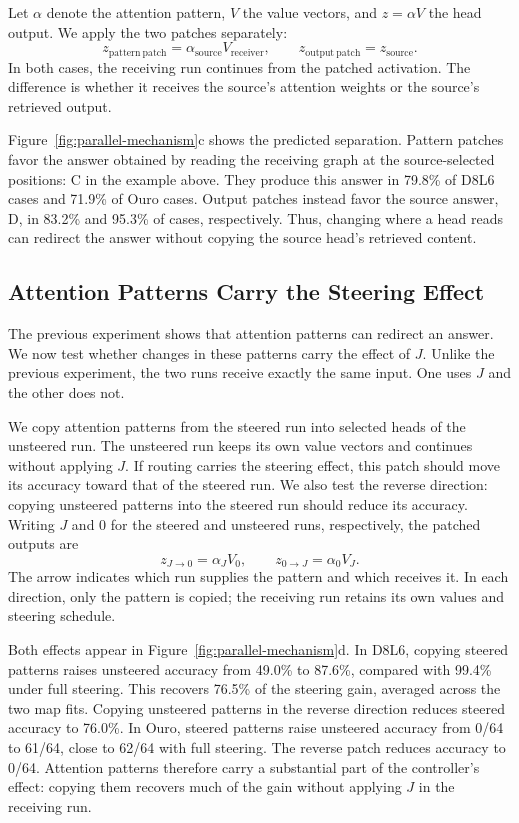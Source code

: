 \documentclass{article}
\begin{document}
Let $\alpha$ denote the attention pattern, $V$ the value vectors, and $z=\alpha V$ the head output. We apply the two patches separately:
\begin{equation}
 z_{\mathrm{pattern\ patch}}=\alpha_{\mathrm{source}}V_{\mathrm{receiver}},
 \qquad
 z_{\mathrm{output\ patch}}=z_{\mathrm{source}}.
\end{equation}
In both cases, the receiving run continues from the patched activation. The difference is whether it receives the source's attention weights or the source's retrieved output.

Figure~\ref{fig:parallel-mechanism}c shows the predicted separation. Pattern patches favor the answer obtained by reading the receiving graph at the source-selected positions: C in the example above. They produce this answer in 79.8\% of D8L6 cases and 71.9\% of Ouro cases. Output patches instead favor the source answer, D, in 83.2\% and 95.3\% of cases, respectively. Thus, changing where a head reads can redirect the answer without copying the source head's retrieved content.

\subsection{Attention Patterns Carry the Steering Effect}
\label{sec:routing}\label{sec:qkv}
The previous experiment shows that attention patterns can redirect an answer. We now test whether changes in these patterns carry the effect of $J$. Unlike the previous experiment, the two runs receive exactly the same input. One uses $J$ and the other does not.

We copy attention patterns from the steered run into selected heads of the unsteered run. The unsteered run keeps its own value vectors and continues without applying $J$. If routing carries the steering effect, this patch should move its accuracy toward that of the steered run. We also test the reverse direction: copying unsteered patterns into the steered run should reduce its accuracy. Writing $J$ and $0$ for the steered and unsteered runs, respectively, the patched outputs are
\begin{equation}
 z_{J\rightarrow 0}=\alpha_J V_0,
 \qquad
 z_{0\rightarrow J}=\alpha_0 V_J.
\end{equation}
The arrow indicates which run supplies the pattern and which receives it. In each direction, only the pattern is copied; the receiving run retains its own values and steering schedule.

Both effects appear in Figure~\ref{fig:parallel-mechanism}d. In D8L6, copying steered patterns raises unsteered accuracy from 49.0\% to 87.6\%, compared with 99.4\% under full steering. This recovers 76.5\% of the steering gain, averaged across the two map fits. Copying unsteered patterns in the reverse direction reduces steered accuracy to 76.0\%. In Ouro, steered patterns raise unsteered accuracy from 0/64 to 61/64, close to 62/64 with full steering. The reverse patch reduces accuracy to 0/64. Attention patterns therefore carry a substantial part of the controller's effect: copying them recovers much of the gain without applying $J$ in the receiving run.
\end{document}
